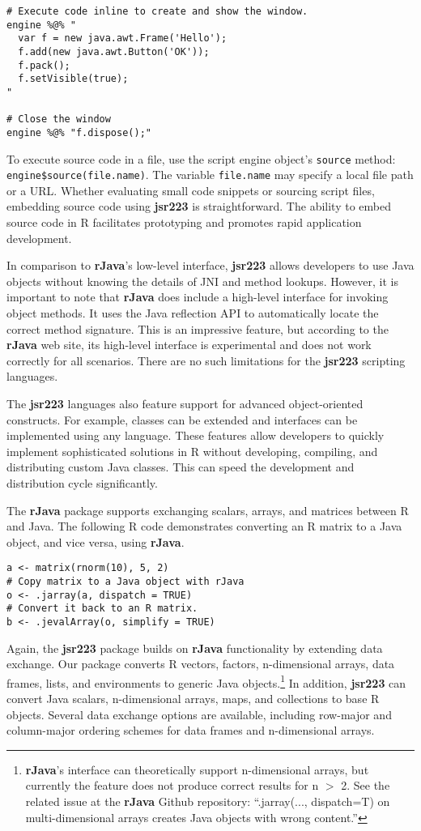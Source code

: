 \documentclass[
article,
11pt, %
a4paper, %
oneside, %
headinclude,footinclude, %
]{scrartcl}
\theoremstyle{definition} %
\theoremstyle{plain} %
\theoremstyle{remark} %
\newcommand{\pkg}[1]{\textbf{#1}}
\newcommand{\code}[1]{\texttt{#1}}
\begin{document}
\begin{verbatim}
# Execute code inline to create and show the window.
engine %@% "
  var f = new java.awt.Frame('Hello');
  f.add(new java.awt.Button('OK'));
  f.pack();
  f.setVisible(true);
"

# Close the window
engine %@% "f.dispose();"
\end{verbatim}
To execute source code in a file, use the script engine object's \code{source} method: 
\newline \code{engine\$source(file.name)}. The variable \code{file.name} may specify a local file path or a URL. Whether evaluating small code snippets or sourcing script files, embedding source code using \pkg{jsr223} is straightforward. The ability to embed source code in R facilitates prototyping and promotes rapid application development.

In comparison to \pkg{rJava}'s low-level interface, \pkg{jsr223} allows developers to use Java objects without knowing the details of JNI and method lookups. However, it is important to note that \pkg{rJava} does include a high-level interface for invoking object methods. It uses the Java reflection API to automatically locate the correct method signature. This is an impressive feature, but according to the \pkg{rJava} web site, its high-level interface is experimental and does not work correctly for all scenarios. There are no such limitations for the \pkg{jsr223} scripting languages.

The \pkg{jsr223} languages also feature support for advanced object-oriented constructs. For example, classes can be extended and interfaces can be implemented using any language. These features allow developers to quickly implement sophisticated solutions in R without developing, compiling, and distributing custom Java classes. This can speed the development and distribution cycle significantly.

The \pkg{rJava} package supports exchanging scalars, arrays, and matrices between R and Java. The following R code demonstrates converting an R matrix to a Java object, and vice versa, using \pkg{rJava}.

\begin{verbatim}
a <- matrix(rnorm(10), 5, 2)
# Copy matrix to a Java object with rJava
o <- .jarray(a, dispatch = TRUE)
# Convert it back to an R matrix.
b <- .jevalArray(o, simplify = TRUE)
\end{verbatim}

Again, the \pkg{jsr223} package builds on \pkg{rJava} functionality by extending data exchange. Our package converts R vectors, factors, n-dimensional arrays, data frames, lists, and environments to generic Java objects.\footnote{\pkg{rJava}'s interface can theoretically support n-dimensional arrays, but currently the feature does not produce correct results for n $>$ 2. See the related issue at the \pkg{rJava} Github repository: ``.jarray(..., dispatch=T) on multi-dimensional arrays creates Java objects with wrong content.''} In addition, \pkg{jsr223} can convert Java scalars, n-dimensional arrays, maps, and collections to base R objects. Several data exchange options are available, including row-major and column-major ordering schemes for data frames and n-dimensional arrays.
\end{document}
